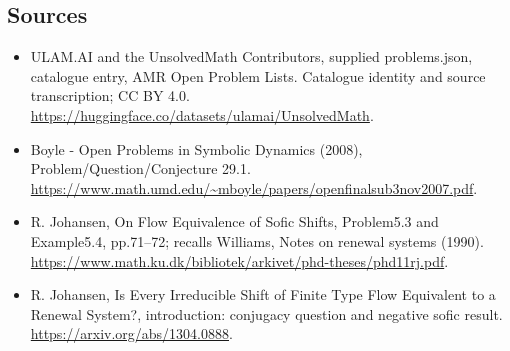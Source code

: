\documentclass[11pt,a4paper]{article}
\begin{document}
\subsection{Sources}
\begin{itemize}
\item[S1] ULAM.AI and the UnsolvedMath Contributors, supplied problems.json, catalogue entry, AMR Open Problem Lists. Catalogue identity and source transcription; CC BY 4.0.
\url{https://huggingface.co/datasets/ulamai/UnsolvedMath}.
\item[S2] Boyle - Open Problems in Symbolic Dynamics (2008), Problem/Question/Conjecture 29.1. 
\url{https://www.math.umd.edu/~mboyle/papers/openfinalsub3nov2007.pdf}.
\item[S3] R. Johansen, On Flow Equivalence of Sofic Shifts, Problem5.3 and Example5.4, pp.71–72; recalls Williams, Notes on renewal systems (1990).
\url{https://www.math.ku.dk/bibliotek/arkivet/phd-theses/phd11rj.pdf}.
\item[S4] R. Johansen, Is Every Irreducible Shift of Finite Type Flow Equivalent to a Renewal System?, introduction: conjugacy question and negative sofic result.
\url{https://arxiv.org/abs/1304.0888}.
\end{itemize}
\end{document}
